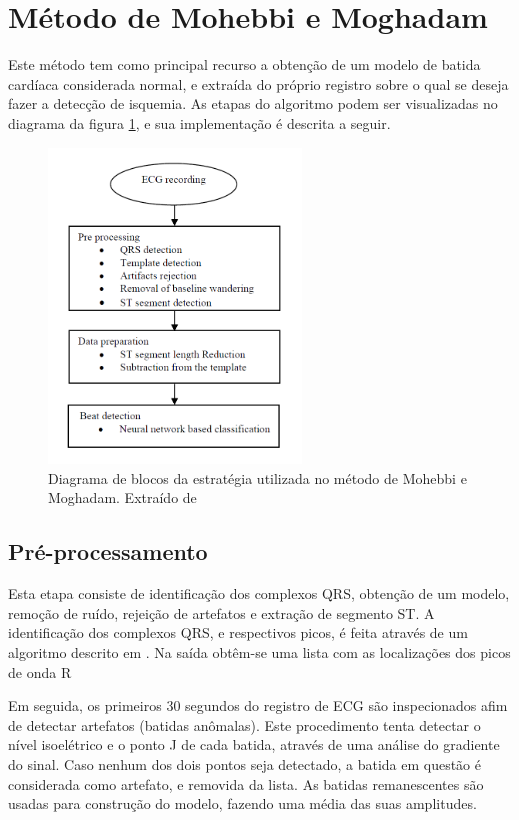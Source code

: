 
\section{Método de Mohebbi e Moghadam}
\label{sec:section3}
Este método tem como principal recurso a obtenção de um modelo de batida cardíaca considerada normal, e extraída do próprio registro sobre o qual se deseja fazer a detecção de isquemia. As etapas do algoritmo podem ser visualizadas no diagrama da figura \ref{fig:mohebbi_01}, e sua implementação é descrita a seguir.

\begin{figure}[ht]
    \centering
    \includegraphics[width=0.6\textwidth]{figures/mohebbi_01.png}
    \caption{Diagrama de blocos da estratégia utilizada no método de Mohebbi e Moghadam. Extraído de \cite{Mohebbi07}}
    \label{fig:mohebbi_01}
\end{figure}

\subsection{Pré-processamento}
Esta etapa consiste de identificação dos complexos QRS, obtenção de um modelo, remoção de ruído, rejeição de artefatos e extração de segmento ST. A identificação dos complexos QRS, e respectivos picos, é feita através de um algoritmo descrito em \cite{Tompkins85}. Na saída obtêm-se uma lista com as localizações dos picos de onda R

Em seguida, os primeiros 30 segundos do registro de ECG são inspecionados afim de detectar artefatos (batidas anômalas). Este procedimento tenta detectar o nível isoelétrico e o ponto J de cada batida, através de uma análise do gradiente do sinal. Caso nenhum dos dois pontos seja detectado, a batida em questão é considerada como artefato, e removida da lista. As batidas remanescentes são usadas para construção do modelo, fazendo uma média das suas amplitudes.

